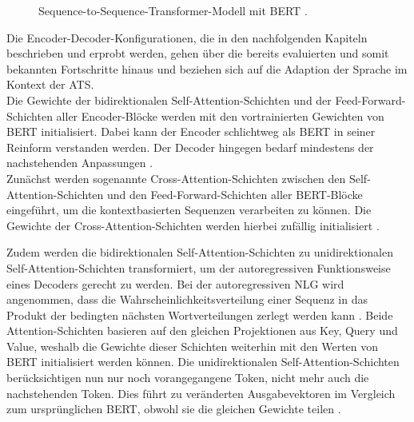 \begin{figure}[h!]
  \centering
  \caption{Sequence-to-Sequence-Transformer-Modell mit BERT \cite{VON20}.}
  \label{pic:EncoderDecoderBert}
\end{figure}

\noindent
Die Encoder-Decoder-Konfigurationen, die in den nachfolgenden Kapiteln beschrieben und erprobt werden, gehen über die bereits evaluierten und somit bekannten Fortschritte hinaus und beziehen sich auf die Adaption der Sprache im Kontext der \ac{ATS}.\\

\noindent
Die Gewichte der bidirektionalen Self-Attention-Schichten und der Feed-Forward-Schichten aller Encoder-Blöcke werden mit den vortrainierten Gewichten von \ac{BERT} initialisiert. Dabei kann der Encoder schlichtweg als \ac{BERT} in seiner Reinform verstanden werden. Der Decoder hingegen bedarf mindestens der nachstehenden Anpassungen \cite{VON20}.\\

\noindent
Zunächst werden sogenannte Cross-Attention-Schichten zwischen den Self-Attention-Schichten und den Feed-Forward-Schichten aller \ac{BERT}-Blöcke eingeführt, um die kontextbasierten Sequenzen verarbeiten zu können. Die Gewichte der Cross-Attention-Schichten werden hierbei zufällig initialisiert \cite{VON20}.
\newpage

\noindent
Zudem werden die bidirektionalen Self-Attention-Schichten zu unidirektionalen Self-Attention-Schichten transformiert, um der autoregressiven Funktionsweise eines Decoders gerecht zu werden. Bei der autoregressiven \ac{NLG} wird angenommen, dass die Wahrscheinlichkeitsverteilung einer Sequenz in das Produkt der bedingten nächsten Wortverteilungen zerlegt werden kann \cite{VON20}. Beide Attention-Schichten basieren auf den gleichen Projektionen aus Key, Query und Value, weshalb die Gewichte dieser Schichten weiterhin mit den Werten von \ac{BERT} initialisiert werden können. Die unidirektionalen Self-Attention-Schichten berücksichtigen nun nur noch vorangegangene Token, nicht mehr auch die nachstehenden Token. Dies führt zu veränderten Ausgabevektoren im Vergleich zum ursprünglichen \ac{BERT}, obwohl sie die gleichen Gewichte teilen \cite[S.~2]{ROT20}.\\

